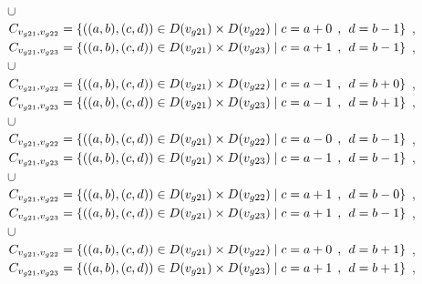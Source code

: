 \\$\cup$
\\$C_{v_{g21},v_{g22}}=\{((a,b),(c,d))\in D(v_{g21}) \times D(v_{g22})\mid c = a + 0\hspace{1ex} , \hspace{1ex}  d = b - 1 \}$ , 
\\$C_{v_{g21},v_{g23}}=\{((a,b),(c,d))\in D(v_{g21}) \times D(v_{g23})\mid c = a + 1\hspace{1ex} , \hspace{1ex}  d = b - 1 \}$ , 
\\$\cup$
\\$C_{v_{g21},v_{g22}}=\{((a,b),(c,d))\in D(v_{g21}) \times D(v_{g22})\mid c = a - 1\hspace{1ex} , \hspace{1ex}  d = b + 0 \}$ , 
\\$C_{v_{g21},v_{g23}}=\{((a,b),(c,d))\in D(v_{g21}) \times D(v_{g23})\mid c = a - 1\hspace{1ex} , \hspace{1ex}  d = b + 1 \}$ , 
\\$\cup$
\\$C_{v_{g21},v_{g22}}=\{((a,b),(c,d))\in D(v_{g21}) \times D(v_{g22})\mid c = a - 0\hspace{1ex} , \hspace{1ex}  d = b - 1 \}$ , 
\\$C_{v_{g21},v_{g23}}=\{((a,b),(c,d))\in D(v_{g21}) \times D(v_{g23})\mid c = a - 1\hspace{1ex} , \hspace{1ex}  d = b - 1 \}$ , 
\\$\cup$
\\$C_{v_{g21},v_{g22}}=\{((a,b),(c,d))\in D(v_{g21}) \times D(v_{g22})\mid c = a + 1\hspace{1ex} , \hspace{1ex}  d = b - 0 \}$ , 
\\$C_{v_{g21},v_{g23}}=\{((a,b),(c,d))\in D(v_{g21}) \times D(v_{g23})\mid c = a + 1\hspace{1ex} , \hspace{1ex}  d = b - 1 \}$ , 
\\$\cup$
\\$C_{v_{g21},v_{g22}}=\{((a,b),(c,d))\in D(v_{g21}) \times D(v_{g22})\mid c = a + 0\hspace{1ex} , \hspace{1ex}  d = b + 1 \}$ , 
\\$C_{v_{g21},v_{g23}}=\{((a,b),(c,d))\in D(v_{g21}) \times D(v_{g23})\mid c = a + 1\hspace{1ex} , \hspace{1ex}  d = b + 1 \}$ , 
